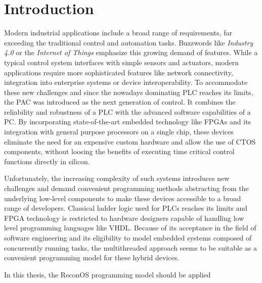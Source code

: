 \chapter{Introduction}

Modern industrial applications include a broad range of requirements, far
exceeding the traditional control and automation tasks. Buzzwords like
\emph{Industry 4.0} or the \emph{Internet of Things} emphasize this growing
demand of features. While a typical control system interfaces with simple
sensors and actuators, modern applications require more sophisticated features
like network connectivity, integration into enterprise systems or device
interoperability. To accommodate these new challenges and since the nowadays
dominating \ac{PLC} reaches its limits, the \ac{PAC} was introduced as the
next generation of control. It combines the reliability and robustness of a
\ac{PLC} with the advanced software capabilities of a PC. By incorporating
state-of-the-art embedded technology like \acp{FPGA} and its integration with
general purpose processors on a single chip, these devices eliminate the need
for an expensive custom hardware and allow  the use of \ac{CTOS} components,
without loosing the benefits of executing time critical control functions
directly in silicon.

Unfortunately, the increasing complexity of such systems introduces new
challenges and demand convenient programming methods abstracting from the
underlying low-level components to make these devices accessible to a broad
range of developers. Classical ladder logic used for \acp{PLC} reaches its
limits and \ac{FPGA} technology is restricted to hardware designers capable of
handling low level programming languages like VHDL. Because of its acceptance
in the field of software engineering and its eligibility to model embedded
systems composed of concurrently running tasks, the multithreaded approach
seems to be suitable as a convenient programming model for these hybrid
devices.

In this thesis, the ReconOS programming model should be applied 

